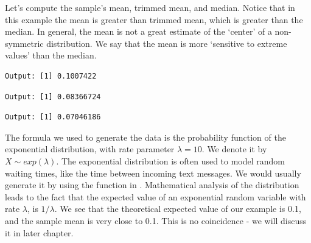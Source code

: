 Let's compute the sample's mean, trimmed mean, and median. Notice that  in this example the mean is greater than trimmed mean, which is greater than the median. In general, the mean is not a great estimate of the `center' of a non-symmetric distribution. We say that the mean is more `sensitive to extreme values' than the median.
\begin{knitrout}
\color{fgcolor}\begin{kframe}
\begin{alltt}
\end{alltt}
\begin{verbatim}
Output: [1] 0.1007422
\end{verbatim}
\begin{alltt}
 \hlstd{=}\hlstd{)}
\end{alltt}
\begin{verbatim}
Output: [1] 0.08366724
\end{verbatim}
\begin{alltt}
\end{alltt}
\begin{verbatim}
Output: [1] 0.07046186
\end{verbatim}
\end{kframe}
\end{knitrout}

The formula we used to generate the data is the probability function of the exponential distribution, with rate parameter $\lambda=10$. We denote it by $X\sim exp(\lambda)$. The exponential distribution is often used to model random waiting times, like the time between incoming text messages. We would usually generate it by using the  function in \R.
Mathematical analysis of the distribution leads to the fact that the expected value of an exponential random variable with rate $\lambda$, is $1/\lambda$. We see that the theoretical expected value of our example is 0.1, and the sample mean is very close to 0.1. This is no coincidence - we will discuss it in  later chapter.


